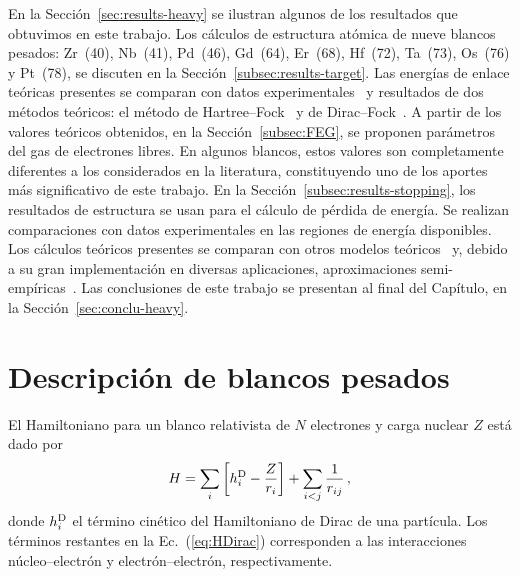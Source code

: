 En la Sección~\ref{sec:results-heavy} se ilustran algunos de los 
resultados que obtuvimos en este trabajo. Los cálculos de estructura 
atómica de nueve blancos pesados: Zr~(40), Nb~(41), Pd~(46), Gd~(64), 
Er~(68), Hf~(72), Ta~(73), Os~(76) y Pt~(78), se discuten en la 
Sección~\ref{subsec:results-target}. 
Las energías de enlace teóricas presentes se comparan con datos 
experimentales~\cite{Williams:95} y resultados de dos métodos teóricos: 
el método de Hartree--Fock~\cite{FroeseFischer:97} y de 
Dirac--Fock~\cite{Desclaux:73}. A partir de los valores teóricos 
obtenidos, en la Sección~\ref{subsec:FEG}, se proponen parámetros del 
gas de electrones libres. En algunos blancos, estos valores son 
completamente diferentes a los considerados en la literatura, 
constituyendo uno de los aportes más significativo de este trabajo. En 
la Sección~\ref{subsec:results-stopping}, los resultados de estructura 
se usan para el cálculo de pérdida de energía. Se realizan comparaciones 
con datos experimentales en las regiones de energía disponibles. Los 
cálculos teóricos presentes se comparan con otros modelos 
teóricos~\cite{Grande:01,casp52,DPASS20} y, debido a su gran 
implementación en diversas aplicaciones, aproximaciones 
semi-empíricas~\cite{Ziegler01,ICRU49}. 
Las conclusiones de este trabajo se presentan al final del Capítulo, en 
la Sección~\ref{sec:conclu-heavy}.



\section{Descripción de blancos pesados}
\label{sec:method-target}

El Hamiltoniano para un blanco relativista de $N$ electrones y carga 
nuclear $Z$ está dado por
\begin{equation}
H = \sum_i \left[ h_i^{\mbox{\scriptsize D}} - \frac{Z}{r_i}\right]
+ \sum_{i<j}\frac{1}{r_{ij}}\,,
\label{eq:HDirac}
\end{equation}
donde $h_i^{\mbox{\scriptsize D}}$ el término cinético del 
Hamiltoniano de Dirac de una partícula. Los términos restantes en la
Ec.~(\ref{eq:HDirac}) corresponden a las interacciones 
núcleo--electrón y electrón--electrón, respectivamente. 

